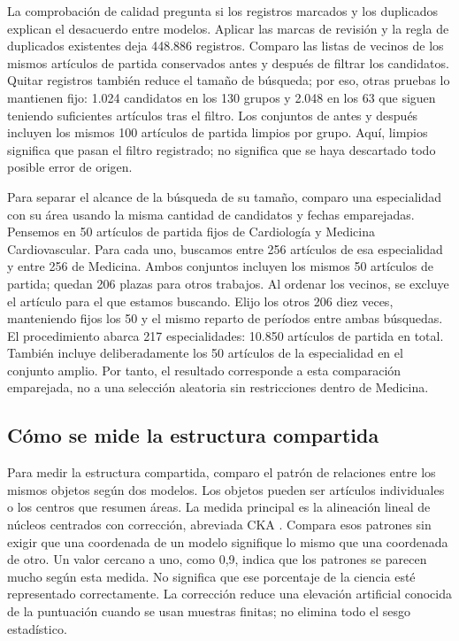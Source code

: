 \documentclass[12pt]{article}
\begin{document}
La comprobación de calidad pregunta si los registros marcados y los duplicados explican el desacuerdo entre modelos. Aplicar las marcas de revisión y la regla de duplicados existentes deja 448.886 registros. Comparo las listas de vecinos de los mismos artículos de partida conservados antes y después de filtrar los candidatos. Quitar registros también reduce el tamaño de búsqueda; por eso, otras pruebas lo mantienen fijo: 1.024 candidatos en los 130 grupos y 2.048 en los 63 que siguen teniendo suficientes artículos tras el filtro. Los conjuntos de antes y después incluyen los mismos 100 artículos de partida limpios por grupo. Aquí, limpios significa que pasan el filtro registrado; no significa que se haya descartado todo posible error de origen.

Para separar el alcance de la búsqueda de su tamaño, comparo una especialidad con su área usando la misma cantidad de candidatos y fechas emparejadas. Pensemos en 50 artículos de partida fijos de Cardiología y Medicina Cardiovascular. Para cada uno, buscamos entre 256 artículos de esa especialidad y entre 256 de Medicina. Ambos conjuntos incluyen los mismos 50 artículos de partida; quedan 206 plazas para otros trabajos. Al ordenar los vecinos, se excluye el artículo para el que estamos buscando. Elijo los otros 206 diez veces, manteniendo fijos los 50 y el mismo reparto de períodos entre ambas búsquedas. El procedimiento abarca 217 especialidades: 10.850 artículos de partida en total. También incluye deliberadamente los 50 artículos de la especialidad en el conjunto amplio. Por tanto, el resultado corresponde a esta comparación emparejada, no a una selección aleatoria sin restricciones dentro de Medicina.

\subsection{Cómo se mide la estructura compartida}
Para medir la estructura compartida, comparo el patrón de relaciones entre los mismos objetos según dos modelos. Los objetos pueden ser artículos individuales o los centros que resumen áreas. La medida principal es la alineación lineal de núcleos centrados con corrección, abreviada CKA \citep{pmlr-v97-kornblith19a,refa961d84a4e}. Compara esos patrones sin exigir que una coordenada de un modelo signifique lo mismo que una coordenada de otro. Un valor cercano a uno, como 0,9, indica que los patrones se parecen mucho según esta medida. No significa que ese porcentaje de la ciencia esté representado correctamente. La corrección reduce una elevación artificial conocida de la puntuación cuando se usan muestras finitas; no elimina todo el sesgo estadístico.
\end{document}
